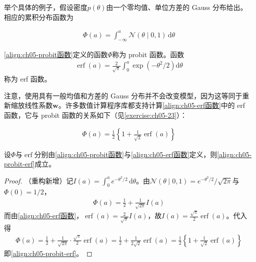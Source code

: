\documentclass[../../main.tex]{subfiles}
\begin{document}
举个具体的例子，假设密度$p(\theta)$由一个零均值、单位方差的 Gauss 分布给出。相应的累积分布函数为

\begin{align}
  \Phi(a)=\int_{-\infty}^{a}\mathcal{N}(\theta\mid 0,1)\,\mathrm{d}\theta
  \label{align:ch05-probit函数}
\end{align}

\begin{definition}\label{definition:ch05-probit函数}
\eqref{align:ch05-probit函数}定义的函数$\Phi$称为 probit 函数。函数
\begin{align}
  \operatorname{erf}(a)=\frac{2}{\sqrt{\pi}}\int_{0}^{a}\exp\left(-\theta^{2}/2\right)\mathrm{d}\theta
  \label{align:ch05-erf函数}
\end{align}
称为 erf 函数。
\end{definition}

注意，使用具有一般均值和方差的 Gauss 分布并不会改变模型，因为这等同于重新缩放线性系数$\boldsymbol{w}$。许多数值计算程序库都支持计算\eqref{align:ch05-erf函数}中的 erf 函数，它与 probit 函数的关系如下（见\cref{exercise:ch05-23}）：

\begin{align}
  \Phi(a)=\frac{1}{2}\left\{1+\frac{1}{\sqrt{2}}\operatorname{erf}(a)\right\}
  \label{align:ch05-probit-erf}
\end{align}

\begin{proposition}\label{proposition:ch05-probit与erf}
设$\Phi$与$\operatorname{erf}$分别由\eqref{align:ch05-probit函数}与\eqref{align:ch05-erf函数}定义，则\eqref{align:ch05-probit-erf}成立。
\end{proposition}

\begin{proof}
（重构新增）记$I(a)=\int_0^a e^{-\theta^{2}/2}\,\mathrm{d}\theta$。由$\mathcal{N}(\theta\mid0,1)=e^{-\theta^{2}/2}/\sqrt{2\pi}$与$\Phi(0)=1/2$，
\begin{align}
  \Phi(a)=\frac{1}{2}+\frac{1}{\sqrt{2\pi}}I(a)
\end{align}
而由\eqref{align:ch05-erf函数}，$\operatorname{erf}(a)=\frac{2}{\sqrt{\pi}}I(a)$，故$I(a)=\frac{\sqrt{\pi}}{2}\operatorname{erf}(a)$。代入得
\begin{align}
  \Phi(a)=\frac{1}{2}+\frac{1}{\sqrt{2\pi}}\cdot\frac{\sqrt{\pi}}{2}\operatorname{erf}(a)=\frac{1}{2}+\frac{1}{2\sqrt{2}}\operatorname{erf}(a)=\frac{1}{2}\left\{1+\frac{1}{\sqrt{2}}\operatorname{erf}(a)\right\}
\end{align}
即\eqref{align:ch05-probit-erf}。
\end{proof}
\end{document}
